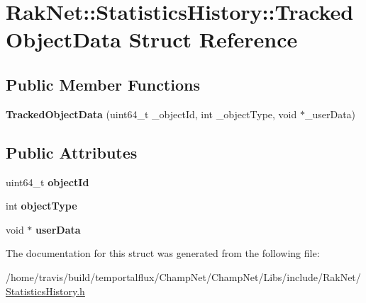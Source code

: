 \hypertarget{struct_rak_net_1_1_statistics_history_1_1_tracked_object_data}{\section{Rak\-Net\-:\-:Statistics\-History\-:\-:Tracked\-Object\-Data Struct Reference}
\label{struct_rak_net_1_1_statistics_history_1_1_tracked_object_data}
}
\subsection*{Public Member Functions}
\begin{DoxyCompactItemize}
\item 
\hypertarget{struct_rak_net_1_1_statistics_history_1_1_tracked_object_data_a9ead50ab4920461a03ed7b455a8943c6}{{\bfseries Tracked\-Object\-Data} (uint64\-\_\-t \-\_\-object\-Id, int \-\_\-object\-Type, void $\ast$\-\_\-user\-Data)}\label{struct_rak_net_1_1_statistics_history_1_1_tracked_object_data_a9ead50ab4920461a03ed7b455a8943c6}

\end{DoxyCompactItemize}
\subsection*{Public Attributes}
\begin{DoxyCompactItemize}
\item 
\hypertarget{struct_rak_net_1_1_statistics_history_1_1_tracked_object_data_ac1477b045abed655f24d7fc4c465c9e8}{uint64\-\_\-t {\bfseries object\-Id}}\label{struct_rak_net_1_1_statistics_history_1_1_tracked_object_data_ac1477b045abed655f24d7fc4c465c9e8}

\item 
\hypertarget{struct_rak_net_1_1_statistics_history_1_1_tracked_object_data_aa86e5b0587e0cccbb08a8c9da321fbf4}{int {\bfseries object\-Type}}\label{struct_rak_net_1_1_statistics_history_1_1_tracked_object_data_aa86e5b0587e0cccbb08a8c9da321fbf4}

\item 
\hypertarget{struct_rak_net_1_1_statistics_history_1_1_tracked_object_data_a5ea0e49d03312a7b4280c8c8b11ec118}{void $\ast$ {\bfseries user\-Data}}\label{struct_rak_net_1_1_statistics_history_1_1_tracked_object_data_a5ea0e49d03312a7b4280c8c8b11ec118}

\end{DoxyCompactItemize}


The documentation for this struct was generated from the following file\-:\begin{DoxyCompactItemize}
\item 
/home/travis/build/temportalflux/\-Champ\-Net/\-Champ\-Net/\-Libs/include/\-Rak\-Net/\hyperlink{_statistics_history_8h}{Statistics\-History.\-h}\end{DoxyCompactItemize}
